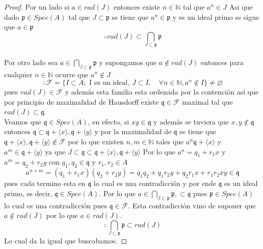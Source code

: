 \documentclass{article}
\begin{document}
\begin{proof}
    Por un lado si $a \in rad(J)$ entonces existe $n\in \mathbb{N}$
    tal que $a^n \in J$ Asi que dado $\mathfrak{p}\in Spec(A)$ tal que
    $J \subset \mathfrak{p}$ se tiene que $a^n \in \mathfrak{p}$ y 
    es un ideal primo se sigue que $a \in \mathfrak{p}$
    $$\therefore rad(J)\subset \bigcap_{J\subset \mathfrak{p}} \mathfrak{p}$$
    \\
    Por otro lado sea $a\in \bigcap_{J\subset \mathfrak{p}} \mathfrak{p}$ y
    supongamos que $a \notin rad(J)$ entonces para cualquier $n \in \mathbb{N}$
    ocurre que $a^n \notin J$ 
    $$\therefore \mathcal{F} = \{I\subset A; 
    \mbox{ I es un ideal, } J\subset I, \quad 
    \forall n\in \mathbb{N}, a^n \notin I\} \neq \varnothing$$
    pues $rad(J) \in \mathcal{F}$ y además esta familia 
    esta ordenada por la contención así que por principio 
    de maximalidad de Hausdorff existe $\mathfrak{q} \in \mathcal{F}$
    maximal tal que $rad(J) \subset \mathfrak{q}$.\\
    Veamos que $\mathfrak{q} \in Spec(A)$, en efecto,
    si $xy \in \mathfrak{q}$ y además se tuviera que $x,y\notin\mathfrak{q}$
    entonces $\mathfrak{q}\subset \mathfrak{q}+ \langle x \rangle, \mathfrak{q}+ \langle y \rangle$
    y por la maximalidad de $\mathfrak{q}$ se tiene que 
    $\mathfrak{q}+ \langle x \rangle, \mathfrak{q}+ \langle y \rangle \notin \mathcal{F}$
    por lo que existen $n, m \in \mathbb{N}$ tales que 
    $a^n \mathfrak{q}+ \langle x \rangle$ y $a^m \in\mathfrak{q}+ \langle y \rangle$
    ya que $J \subset \mathfrak{q} \subset \mathfrak{q}+ \langle x \rangle, \mathfrak{q}+ \langle y \rangle$
    Por lo que $a^n = q_1 + r_1x$ y $a^m = q_2 + r_2 y$ con $q_1, q_2 \in \mathfrak{q}$
    y $r_1, r_2 \in A$
    $$a^{n+m} = (q_1+r_1x)(q_2+r_2y) = q_1q_2 + q_1r_2y + q_2r_1x + r_1r_2xy \in \mathfrak{q}$$
    pues cada termino esta en $\mathfrak{q}$
    lo cual es una contradicción y por ende $\mathfrak{q}$ es un ideal 
    primo, es decir, $\mathfrak{q} \in Spec(A)$.
    Por lo que $a \in \bigcap_{J\subset \mathfrak{p}} \mathfrak{p},
    \subset \mathfrak{q}$  pues $\mathfrak{p} \in Spec(A)$
    lo cual es una contradicción pues $\mathfrak{q}\in \mathcal{F}$.
    Esta contradicción vino de suponer que $a\notin rad(J)$ por lo que 
    $a \in rad(J)$.
    $$\therefore \bigcap_{J\subset \mathfrak{p}} \mathfrak{p} \subset rad(J)$$
    Lo cual da la igual que buscabamos.

\end{proof}
\end{document}
